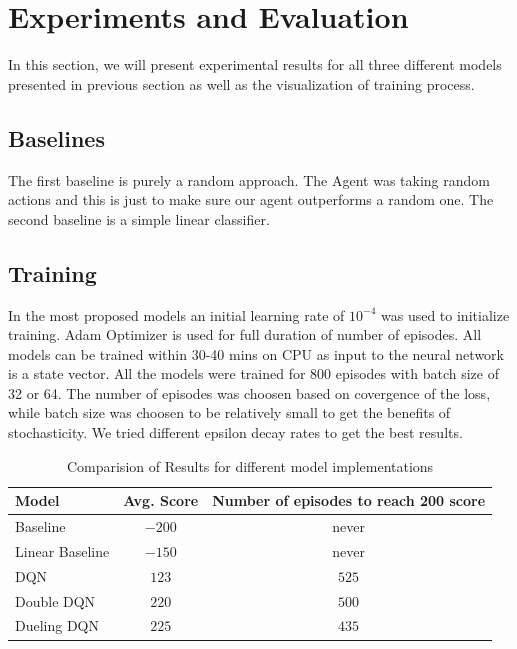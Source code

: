 \section{Experiments and Evaluation}
In this section, we will present experimental results for all three different models presented in previous section as well as the visualization of training process.


\subsection{ Baselines}
The first baseline is purely a random approach. The Agent was taking random actions and this is just to make sure our agent outperforms a random one. 
The second baseline is a simple linear classifier.

\subsection{ Training}
In the most proposed models an initial learning rate of $10^{-4}$ was used to initialize training. Adam Optimizer is used for full duration of number of episodes. All models can be trained within 30-40 mins on CPU as input to the neural network is a state vector. All the models were trained for 800 episodes with batch size of 32 or 64. The number of episodes was choosen based on covergence of the loss, while batch size was choosen to be relatively small to get the benefits of stochasticity. We tried different epsilon decay rates to get the best results.

\label{sec:exp}
\begin{table}%
\centering
\begin{tabular}{|l|c|c|}
\hline
Model & Avg. Score  & Number of episodes to reach 200 score  \\
\hline
Baseline & $-200$ & never \\
\hline
Linear Baseline & $-150$ & never \\
\hline
DQN & $123$ & $525$ \\
\hline
Double DQN & $220$ & $500$ \\
\hline
Dueling DQN & $225$ & $435$ \\
\hline
\end{tabular}
\caption{Comparision of Results for different model implementations}
\label{tab:accuracy}
\end{table}

